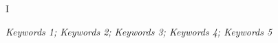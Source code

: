 \newpage
\vspace{-1cm}
\chapter*{\xiaosan {}}
\vspace{-0.5cm}

I

\hspace{-0.5cm}
{}
\textit{Keywords 1; Keywords 2; Keywords 3; Keywords 4; Keywords 5}